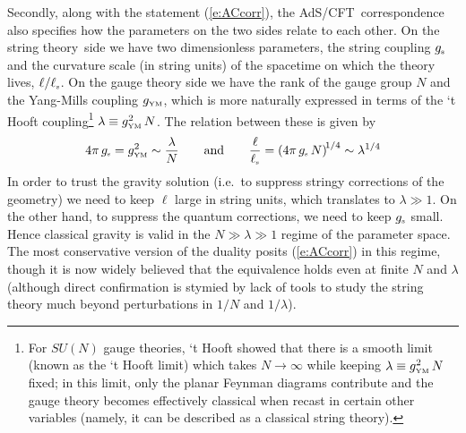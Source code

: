 \documentclass[12pt]{article}
\def\req#1{(\ref{#1})}
\def\AC{AdS/CFT}
\def\STY{string theory}
\def\gst{g_{\scriptscriptstyle {\rm s}}}
\def\gYM{g_{\scriptscriptstyle {\rm YM}}}
\def\lst{\ell_{\scriptscriptstyle {\rm s}}}
\def\Rads{\ell}
\def\andeq{\qquad {\rm and} \qquad}
\begin{document}
Secondly, along with the statement \req{e:ACcorr}, the \AC\ correspondence also specifies how the parameters on the two sides  relate to each other.
On the \STY\ side we have two dimensionless parameters, the string coupling $\gst$ and the curvature scale (in string units) of the spacetime on which the theory lives,  $\Rads/\lst$.  On the gauge theory side we have the rank of the gauge group $N$ and the Yang-Mills coupling $\gYM$, which is more naturally expressed in terms of the `t Hooft coupling\footnote{
For $SU(N)$ gauge theories,  `t Hooft \cite{tHooft:1973jz} showed that there is a smooth limit (known as the `t Hooft limit) which takes $N\to \infty$ while keeping $\lambda \equiv  \gYM^2 \, N$ fixed; in this limit, only the planar Feynman diagrams contribute and the gauge theory becomes effectively classical when recast in certain other variables (namely, it can be described as a classical string theory).}
 $\lambda \equiv  \gYM^2 \, N$.
The relation between these is given by 
%
\begin{equation}
4 \pi \, \gst = \gYM^2  \sim \frac{\lambda}{N}
\andeq
\frac{\Rads}{\lst} 
= \left( 4 \pi \, \gst \, N \right)^{\! 1/4} \sim \lambda^{1/4}
\label{e:pars}
\end{equation}	
%
In order to trust the gravity solution (i.e.\ to suppress stringy corrections of the geometry) we need to keep $\Rads$ large in string units, which translates to $\lambda \gg 1$.  
On the other hand, to suppress the quantum corrections, we need to keep $\gst $ small.  
Hence classical gravity is valid in the $N \gg \lambda \gg 1$ regime of the parameter space.  The most conservative version of the duality posits \req{e:ACcorr} in this regime, though it is now widely believed that the equivalence holds even at finite $N$ and $\lambda$ (although direct confirmation is stymied by lack of tools to study the string theory much  beyond perturbations in $1/N$ and $1/\lambda$).
\end{document}
